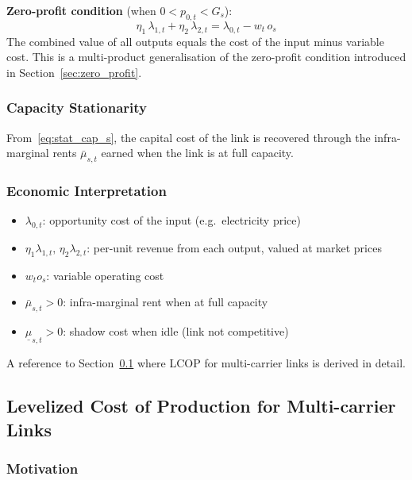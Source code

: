 \documentclass{article}
\begin{document}
\textbf{Zero-profit condition} (when $0 < p_{0,t} < G_s$):
\begin{equation}
    \eta_1\, \lambda_{1,t} + \eta_2\, \lambda_{2,t}
    = \lambda_{0,t} - w_t\, o_s
    \label{eq:zp_multilink}
\end{equation}
The combined value of all outputs equals the cost of the input minus variable cost.
This is a multi-product generalisation of the zero-profit condition
introduced in Section~\ref{sec:zero_profit}.

\subsubsection{Capacity Stationarity}

From~\eqref{eq:stat_cap_s}, the capital cost of the link is recovered through
the infra-marginal rents $\bar{\mu}_{s,t}$ earned when the link is at full capacity.

\subsubsection{Economic Interpretation}

\begin{itemize}
    \item $\lambda_{0,t}$: opportunity cost of the input (e.g.\ electricity price)
    \item $\eta_1 \lambda_{1,t},\, \eta_2 \lambda_{2,t}$: per-unit revenue
          from each output, valued at market prices
    \item $w_t o_s$: variable operating cost
    \item $\bar{\mu}_{s,t} > 0$: infra-marginal rent when at full capacity
    \item $\underline{\mu}_{s,t} > 0$: shadow cost when idle (link not competitive)
\end{itemize}

A reference to Section~\ref{sec:lcop_multilink} where LCOP for multi-carrier links
is derived in detail.

\subsection{Levelized Cost of Production for Multi-carrier Links}
\label{sec:lcop_multilink}

\subsubsection{Motivation}
\end{document}
